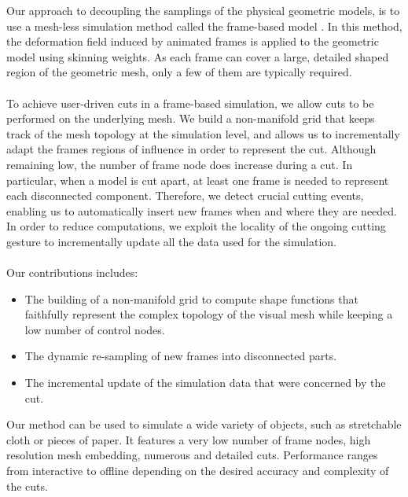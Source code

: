 Our approach to decoupling the samplings of the physical geometric models, is to use a mesh-less simulation method called the frame-based model \cite{Gilles2011}. In this method, the deformation field induced by animated frames is applied to the geometric model using skinning weights. As each frame can cover a large, detailed shaped region of the geometric mesh, only a few of them are typically required.
\\ \\
To achieve user-driven cuts in a frame-based simulation, we allow cuts to be performed on the underlying mesh.
We build a non-manifold grid that keeps track of the mesh topology at the simulation level, and allows us to incrementally adapt the frames regions of influence in order to  represent the cut.
Although remaining low, the number of frame node does increase during a cut. In particular, when a model is cut apart, at least one frame is needed to represent each disconnected component. 
Therefore, we detect crucial cutting events, enabling us to automatically insert new frames when and where they are needed.
In order to reduce computations, we exploit the locality of the ongoing cutting gesture to incrementally update all the data used for the simulation.
\\ \\
Our contributions includes:
\begin{itemize}
\item The building of a non-manifold grid to compute shape functions that faithfully represent the  complex topology of the visual mesh while keeping a low number of control nodes.
\item The dynamic re-sampling of new frames into disconnected parts.
\item The incremental update of the simulation data that were concerned by the cut.
\end{itemize}
Our method can be used to simulate a wide variety of objects, such as stretchable cloth or pieces of paper. It features a very low number of frame nodes, high resolution mesh embedding, numerous and detailed cuts. Performance ranges from interactive to offline depending on the desired accuracy and complexity of the cuts.

